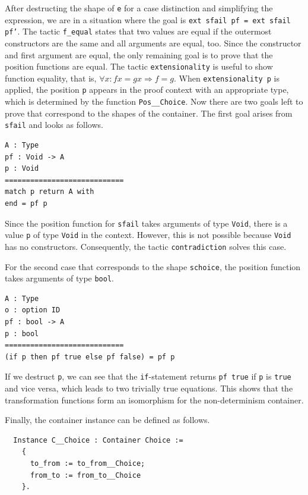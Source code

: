 \documentclass[a4paper, 11pt, fleqn, twoside]{scrreprt}
\newcommand{\hinl}[1]{\texttt{#1}}
\newcommand{\cinl}[1]{\texttt{#1}}
\begin{document}
After destructing the shape of \cinl{e} for a case distinction and simplifying the expression, we are in a situation where the goal is \cinl{ext sfail pf = ext sfail pf'}.
The tactic \cinl{f_equal} states that two values are equal if the outermost constructors are the same and all arguments are equal, too.
Since the constructor and first argument are equal, the only remaining goal is to prove that the position functions are equal.
The tactic \cinl{extensionality} is useful to show function equality, that is, $\forall x: f x = g x \Rightarrow f = g$.
When \cinl{extensionality p} is applied, the position \cinl{p} appears in the proof context with an appropriate type, which is determined by the function \cinl{Pos__Choice}.
Now there are two goals left to prove that correspond to the shapes of the container.
The first goal arises from \cinl{sfail} and looks as follows.

\begin{verbatim}
A : Type
pf : Void -> A
p : Void
============================
match p return A with
end = pf p
\end{verbatim}

Since the position function for \cinl{sfail} takes arguments of type \cinl{Void}, there is a value \cinl{p} of type \cinl{Void} in the context.
However, this is not possible because \cinl{Void} has no constructors.
Consequently, the tactic \cinl{contradiction} solves this case.

For the second case that corresponds to the shape \cinl{schoice}, the position function takes arguments of type \cinl{bool}.

\begin{verbatim}
A : Type
o : option ID
pf : bool -> A
p : bool
============================
(if p then pf true else pf false) = pf p
\end{verbatim}

If we destruct \hinl{p}, we can see that the \cinl{if}-statement returns \cinl{pf true} if \cinl{p} is \cinl{true} and vice versa, which leads to two trivially true equations.
This shows that the transformation functions form an isomorphism for the non-determinism container.

Finally, the container instance can be defined as follows.

\begin{verbatim}
  Instance C__Choice : Container Choice :=
    {
      to_from := to_from__Choice;
      from_to := from_to__Choice
    }.
\end{verbatim}
\end{document}
